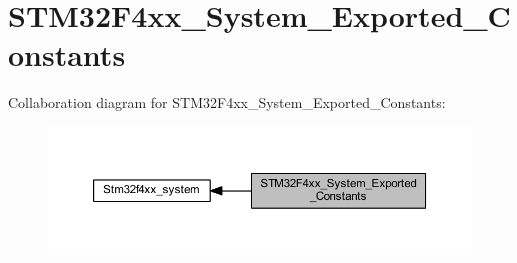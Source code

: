 \hypertarget{group___s_t_m32_f4xx___system___exported___constants}{}\section{S\+T\+M32\+F4xx\+\_\+\+System\+\_\+\+Exported\+\_\+\+Constants}
\label{group___s_t_m32_f4xx___system___exported___constants}
Collaboration diagram for S\+T\+M32\+F4xx\+\_\+\+System\+\_\+\+Exported\+\_\+\+Constants\+:\nopagebreak
\begin{figure}[H]
\begin{center}
\leavevmode
\includegraphics[width=350pt]{group___s_t_m32_f4xx___system___exported___constants}
\end{center}
\end{figure}
